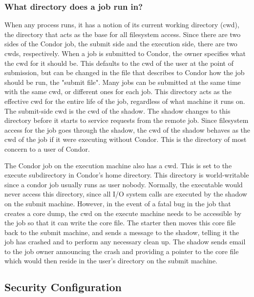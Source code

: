 \subsubsection{\label{sec:DirOfJob}What directory does a job run in?}

When any process runs, it has a notion of its current working
directory (cwd), the directory that acts as the base for all
filesystem access.  Since there are two sides of the Condor job, the
submit side and the execution side, there are two cwds, respectively.
When a job is submitted to Condor, the owner specifies what the cwd
for it should be.  This defaults to the cwd of the user at the point
of submission, but can be changed in the file that describes to Condor
how the job should be run, the "submit file".  Many jobs can be
submitted at the same time with the same cwd, or different ones for
each job.  This directory acts as the effective cwd for the entire
life of the job, regardless of what machine it runs on.  The
submit-side cwd is the cwd of the shadow.  The shadow changes to this
directory before it starts to service requests from the remote job.
Since filesystem access for the job goes through the shadow, the cwd
of the shadow behaves as the cwd of the job if it were executing
without Condor.  This is the directory of most concern to a user of
Condor.

The Condor job on the execution machine also has a cwd.  This
is set to the execute subdirectory in Condor's home directory.  This
directory is world-writable since a condor job usually runs as user
nobody.  Normally, the executable would never access this directory,
since all I/O system calls are executed by the shadow on the submit
machine.  However, in the event of a fatal bug in the job that creates
a core dump, the cwd on the execute machine needs to be accessible by
the job so that it can write the core file.  The starter then moves
this core file back to the submit machine, and sends a message to the
shadow, telling it the job has crashed and to perform any necessary
clean up.  The shadow sends email to the job owner announcing the
crash and providing a pointer to the core file which would then reside
in the user's directory on the submit machine.


\subsection{\label{sec:Config-Security} Security Configuration}

